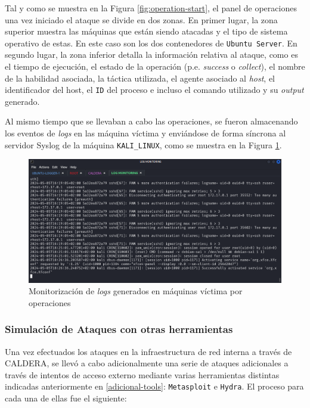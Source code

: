 Tal y como se muestra en la Figura \ref{fig:operation-start}, el panel de operaciones una vez iniciado el ataque se divide en dos zonas. En primer lugar, la zona superior muestra las máquinas que están siendo atacadas y el tipo de sistema operativo de estas. En este caso son los dos contenedores de \texttt{Ubuntu Server}. En segundo lugar, la zona inferior detalla la información relativa al ataque, como es el tiempo de ejecución, el estado de la operación (p.e. \textit{success} o \textit{collect}), el nombre de la habilidad asociada, la táctica utilizada, el agente asociado al \textit{host}, el identificador del host, el \texttt{ID} del proceso e incluso el comando utilizado y su \textit{output} generado. 

Al mismo tiempo que se llevaban a cabo las operaciones, se fueron almacenando los eventos de \textit{logs} en las máquina víctima y enviándose de forma síncrona al servidor Syslog de la máquina \texttt{KALI\_LINUX}, como se muestra en la Figura \ref{fig:log-monitoring-syslog}. 

\begin{figure}[H]
    \centering
    \includegraphics[width=1\linewidth]{imagenes/log-monitoring-syslog.png}
        \caption{Monitorización de \textit{logs} generados en máquinas víctima por operaciones}
    \label{fig:log-monitoring-syslog}
\end{figure}

\subsubsection*{Simulación de Ataques con otras herramientas}

Una vez efectuados los ataques en la infraestructura de red interna a través de \gls{CALDERA}, se llevó a cabo adicionalmente una serie de ataques adicionales a través de intentos de acceso externo mediante varias herramientas distintas indicadas anteriormente en \ref{adicional-tools}: \texttt{Metasploit} e \texttt{Hydra}. El proceso para cada una de ellas fue el siguiente: \\


